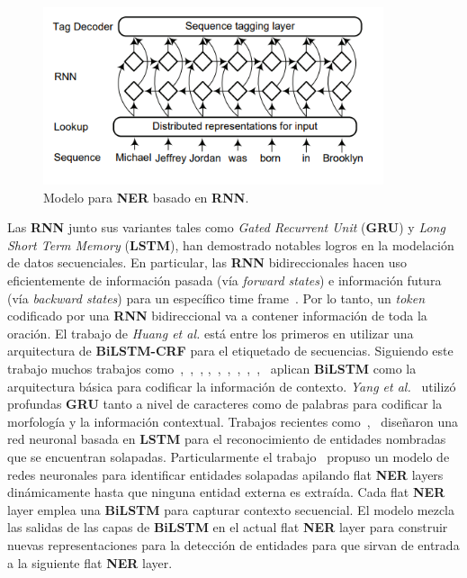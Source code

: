 \begin{figure}[h!]
	\centering
	\includegraphics[width = 10cm]{Imagenes/RNN_Arquitecture.png}
	\caption{Modelo para \textbf{NER} basado en \textbf{RNN}.}\label{fig:RNN}
\end{figure}

Las \textbf{RNN} junto sus variantes tales como \emph{Gated Recurrent Unit} (\textbf{GRU}) y \emph{Long Short Term Memory} (\textbf{LSTM}), han demostrado notables logros en la modelaci\'on de datos secuenciales. En particular, las \textbf{RNN} bidireccionales hacen uso eficientemente de informaci\'on pasada (v\'ia \emph{forward states}) e informaci\'on futura (v\'ia \emph{backward states}) para un espec\'ifico time frame~\cite{huang2015bidirectional}. Por lo tanto, un \emph{token} codificado por una \textbf{RNN} bidireccional va a contener informaci\'on de toda la oraci\'on. El trabajo de \emph{Huang et al.}\cite{huang2015bidirectional} est\'a entre los primeros en utilizar una arquitectura de \textbf{BiLSTM-CRF} para el etiquetado de secuencias. Siguiendo este trabajo muchos trabajos como~\cite{lample2016neural},~\cite{chiu2016named},~\cite{nguyen2016toward},
\cite{zhai2017neural},~\cite{zhou2017joint},~\cite{ma2016end},~\cite{tran2017named},~\cite{rei2016attending},~\cite{wei2016disease},~\cite{lin2017multi} aplican \textbf{BiLSTM} como la arquitectura b\'asica para codificar la informaci\'on de contexto. \emph{Yang et al.}~\cite{yang2016multi} utiliz\'o profundas \textbf{GRU} tanto a nivel de caracteres como de palabras para codificar la morfolog\'ia y la informaci\'on contextual. Trabajos recientes como~\cite{katiyar2018nested},~\cite{ju2018neural} dise\~naron una red neuronal basada en \textbf{LSTM} para el reconocimiento de entidades nombradas que se encuentran solapadas. Particularmente el trabajo~\cite{ju2018neural} propuso un modelo de redes neuronales para identificar entidades solapadas apilando flat \textbf{NER} layers din\'amicamente hasta que ninguna entidad externa es extra\'ida. Cada flat \textbf{NER} layer emplea una \textbf{BiLSTM} para capturar contexto secuencial. El modelo mezcla las salidas de las capas de \textbf{BiLSTM} en el actual flat \textbf{NER} layer para construir nuevas representaciones para la detecci\'on de entidades para que sirvan de entrada a la siguiente flat \textbf{NER} layer.

